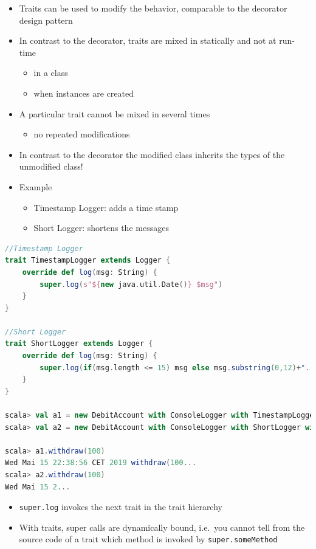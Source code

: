 \begin{itemize}
\tightlist
\item
  Traits can be used to modify the behavior, comparable to the decorator
  design pattern
\item
  In contrast to the decorator, traits are mixed in statically and not
  at run-time

  \begin{itemize}
  \tightlist
  \item
    in a class
  \item
    when instances are created
  \end{itemize}
\item
  A particular trait cannot be mixed in several times

  \begin{itemize}
  \tightlist
  \item
    no repeated modifications
  \end{itemize}
\item
  In contrast to the decorator the modified class inherits the types of
  the unmodified class!
\item
  Example

  \begin{itemize}
  \tightlist
  \item
    Timestamp Logger: adds a time stamp
  \item
    Short Logger: shortens the messages
  \end{itemize}
\end{itemize}

\begin{lstlisting}[language=scala,mathescape=false]
//Timestamp Logger
trait TimestampLogger extends Logger {
    override def log(msg: String) {
        super.log(s"${new java.util.Date()} $msg")
    }
}

//Short Logger
trait ShortLogger extends Logger {
    override def log(msg: String) {
        super.log(if(msg.length <= 15) msg else msg.substring(0,12)+"...")
    }
}

scala> val a1 = new DebitAccount with ConsoleLogger with TimestampLogger with ShortLogger
scala> val a2 = new DebitAccount with ConsoleLogger with ShortLogger with TimestampLogger

scala> a1.withdraw(100)
Wed Mai 15 22:38:56 CET 2019 withdraw(100...
scala> a2.withdraw(100)
Wed Mai 15 2...
\end{lstlisting}

\begin{itemize}
\tightlist
\item
  \texttt{super.log} invokes the next trait in the trait hierarchy
\item
  With traits, super calls are dynamically bound, i.e.~you cannot tell
  from the source code of a trait which method is invoked by
  \texttt{super.someMethod}
\end{itemize}

